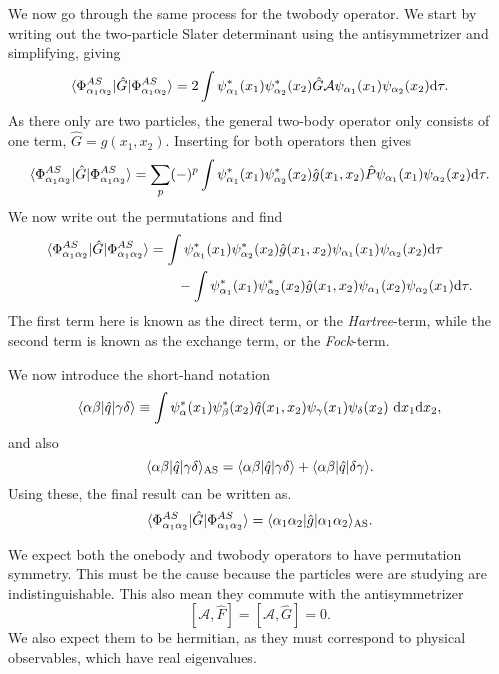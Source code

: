 \documentclass[a4paper, 11pt, notitlepage, english]{article}
\newcommand{\op}[1]{\hat{#1}}
\newcommand{\braopket}[3]{\langle #1 | {#2} | #3 \rangle}
\renewcommand{\d}{{\rm d}}
\begin{document}
\newpage

We now go through the same process for the twobody operator. We start by writing out the two-particle Slater determinant using the antisymmetrizer and simplifying, giving
$$\braopket{\Phi^{AS}_{\alpha_1\alpha_2}}{\op{G}}{\Phi^{AS}_{\alpha_1\alpha_2}} = 2\int \psi^*_{\alpha_1}(x_1)\psi^*_{\alpha_2}(x_2) \op{G} \mathcal{A} \psi_{\alpha_1}(x_1) \psi_{\alpha_2}(x_2) \d \tau.$$
As there only are two particles, the general two-body operator only consists of one term, $\op{G} = g(x_1,x_2)$. Inserting for both operators then gives
$$\braopket{\Phi^{AS}_{\alpha_1\alpha_2}}{\op{G}}{\Phi^{AS}_{\alpha_1\alpha_2}} = \sum_p (-)^p \int \psi^*_{\alpha_1}(x_1)\psi^*_{\alpha_2}(x_2) \op{g}(x_1,x_2) \op{P} \psi_{\alpha_1}(x_1) \psi_{\alpha_2}(x_2) \d \tau.$$
We now write out the permutations and find
\begin{align*}
\braopket{\Phi^{AS}_{\alpha_1\alpha_2}}{\op{G}}{\Phi^{AS}_{\alpha_1\alpha_2}} &=  \int \psi^*_{\alpha_1}(x_1)\psi^*_{\alpha_2}(x_2) \op{g}(x_1,x_2) \psi_{\alpha_1}(x_1) \psi_{\alpha_2}(x_2) \d \tau \\ 
&\qquad - \int \psi^*_{\alpha_1}(x_1)\psi^*_{\alpha_2}(x_2) \op{g}(x_1,x_2)  \psi_{\alpha_1}(x_2) \psi_{\alpha_2}(x_1) \d \tau.
\end{align*}
The first term here is known as the direct term, or the \emph{Hartree}-term, while the second term is known as the exchange term, or the \emph{Fock}-term.

We now introduce the short-hand notation
$$\braopket{\alpha \beta}{\op{q}}{\gamma \delta} \equiv \int \psi^*_{\alpha}(x_1)\psi^*_{\beta}(x_2) \op{q}(x_1,x_2) \psi_{\gamma}(x_1)\psi_{\delta}(x_2) \ \d x_1 \d x_2,$$
and also
$$\braopket{\alpha \beta}{\op{q}}{\gamma \delta}_{\rm AS} = \braopket{\alpha \beta}{\op{q}}{\gamma \delta} + \braopket{\alpha \beta}{\op{q}}{\delta \gamma}.$$
Using these, the final result can be written as.
$$\braopket{\Phi^{AS}_{\alpha_1\alpha_2}}{\op{G}}{\Phi^{AS}_{\alpha_1\alpha_2}} = \braopket{\alpha_1\alpha_2}{\op{g}}{\alpha_1 \alpha_2}_{\rm AS}.$$

We expect both the onebody and twobody operators to have permutation symmetry. This must be the cause because the particles were are studying are indistinguishable. This also mean they commute with the antisymmetrizer
$$[\mathcal{A},\op{F}] = [\mathcal{A},\op{G}] = 0.$$
We also expect them to be hermitian, as they must correspond to physical observables, which have real eigenvalues.

\clearpage
\end{document}
